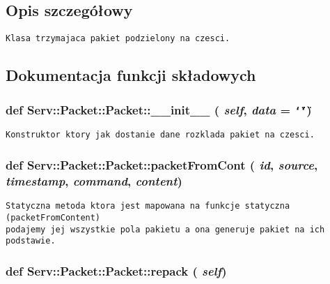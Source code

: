 \subsection{Opis szczegółowy}


\footnotesize\begin{verbatim}Klasa trzymajaca pakiet podzielony na czesci.\end{verbatim}
\normalsize
 

\subsection{Dokumentacja funkcji składowych}
\hypertarget{class_serv_1_1_packet_1_1_packet_1f71ef65b348c86a047c87abe9ca2775}{
\subsubsection[{\_\-\_\-init\_\-\_\-}]{\setlength{\rightskip}{0pt plus 5cm}def Serv::Packet::Packet::\_\-\_\-init\_\-\_\- ( {\em self}, \/   {\em data} = {\tt \char`\"{}\char`\"{}})}}
\label{class_serv_1_1_packet_1_1_packet_1f71ef65b348c86a047c87abe9ca2775}




\footnotesize\begin{verbatim}Konstruktor ktory jak dostanie dane rozklada pakiet na czesci.\end{verbatim}
\normalsize
 \hypertarget{class_serv_1_1_packet_1_1_packet_393243697bc1e23d5adadc50698fccd1}{
\subsubsection[{packetFromCont}]{\setlength{\rightskip}{0pt plus 5cm}def Serv::Packet::Packet::packetFromCont ( {\em id}, \/   {\em source}, \/   {\em timestamp}, \/   {\em command}, \/   {\em content})}}
\label{class_serv_1_1_packet_1_1_packet_393243697bc1e23d5adadc50698fccd1}




\footnotesize\begin{verbatim}Statyczna metoda ktora jest mapowana na funkcje statyczna (packetFromContent)
podajemy jej wszystkie pola pakietu a ona generuje pakiet na ich podstawie.
\end{verbatim}
\normalsize
 \hypertarget{class_serv_1_1_packet_1_1_packet_6dab330b602405f42b3fe090863e5c1e}{
\subsubsection[{repack}]{\setlength{\rightskip}{0pt plus 5cm}def Serv::Packet::Packet::repack ( {\em self})}}
\label{class_serv_1_1_packet_1_1_packet_6dab330b602405f42b3fe090863e5c1e}




